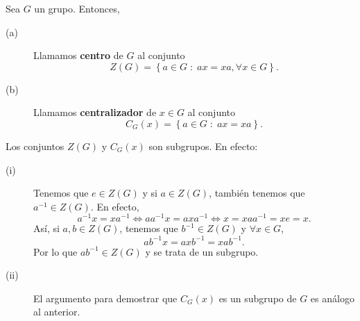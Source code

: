 \begin{definition}
Sea $\displaystyle G $ un grupo. Entonces, 
\begin{description}
\item[(a)] Llamamos \textbf{centro} de $\displaystyle G $ al conjunto 
	\[Z\left(G\right) = \left\{ a \in G \; : \; ax = xa, \forall x \in G\right\}  .\]
\item[(b)] Llamamos \textbf{centralizador} de $\displaystyle x \in G $ al conjunto 
	\[C_{G}\left(x\right) = \left\{ a \in G \; : \; ax = xa\right\}  .\]
\end{description}
\end{definition}
\begin{observation}
Los conjuntos $\displaystyle Z\left(G\right) $ y $\displaystyle C_{G}\left(x\right) $ son subgrupos. En efecto:
\begin{description}
\item[(i)] Tenemos que $\displaystyle e \in Z\left(G\right) $ y si $\displaystyle a \in Z\left(G\right) $, también tenemos que $\displaystyle a^{-1} \in Z\left(G\right) $. En efecto, 
	\[a^{-1}x = xa^{-1} \iff a a^{-1}x = a x a^{-1} \iff x = x a a^{-1} = x e = x .\]
	Así, si $\displaystyle a,b \in Z\left(G\right) $, tenemos que $\displaystyle b^{-1} \in Z\left(G\right) $ y $\displaystyle \forall x \in G $,
	\[ab^{-1}x = axb^{-1} = xab^{-1} .\]
	Por lo que $\displaystyle ab^{-1} \in Z\left(G\right) $ y se trata de un subgrupo.
\item[(ii)] El argumento para demostrar que $\displaystyle C_{G}\left(x\right) $ es un subgrupo de $\displaystyle G $ es análogo al anterior.
\end{description}
\end{observation}


